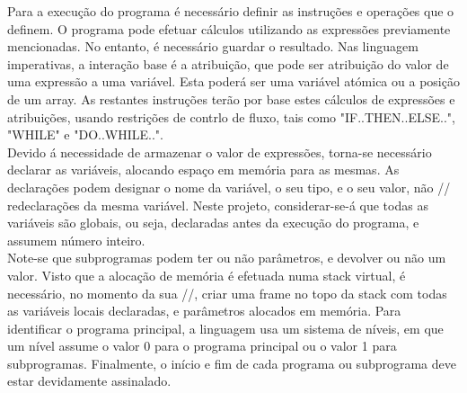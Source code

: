 Para a execução do programa é necessário definir as instruções e operações que
o definem. O programa pode efetuar cálculos utilizando as expressões previamente
mencionadas. No entanto, é necessário guardar o resultado. Nas linguagem imperativas, 
a interação base é a atribuição, que pode ser atribuição do valor de uma expressão 
a uma variável. Esta poderá ser uma variável atómica ou a posição de um array. 
As restantes instruções terão por base estes cálculos de expressões e atribuições, 
usando restrições de contrlo de fluxo, tais como "IF..THEN..ELSE..", "WHILE" 
e "DO..WHILE..".\\

Devido á necessidade de armazenar o valor de expressões, torna-se necessário 
declarar as variáveis, alocando espaço em memória para as mesmas. As declarações 
podem designar o nome da variável, o seu tipo, e o seu valor, não // redeclarações 
da mesma variável. Neste projeto, considerar-se-á que todas as variáveis são globais, 
ou seja, declaradas antes da execução do programa, e assumem número inteiro.\\   

Note-se que subprogramas podem ter ou não parâmetros,
e devolver ou não um valor. Visto que a alocação de memória é efetuada numa
stack virtual, é necessário, no momento da sua //, criar uma frame no topo da
stack com todas as variáveis locais declaradas, e parâmetros alocados em
memória. Para identificar o programa principal, a linguagem usa um sistema de
níveis, em que um nível assume o valor 0 para o programa principal ou o valor
1 para subprogramas. Finalmente, o início e fim de cada programa ou subprograma
deve estar devidamente assinalado.  

 
 
 



 



